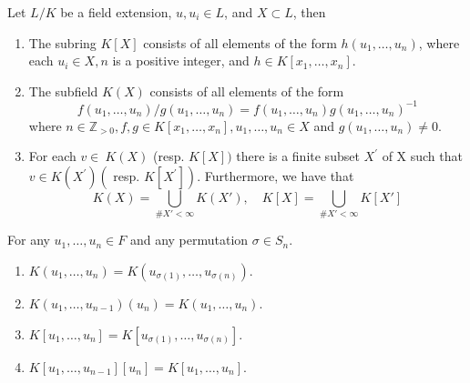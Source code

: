\begin{theorem}
    \label{thm: subfield(subring) generated by sets}
    Let $L/K$ be a field extension, $ u ,  u _{{i}} \in {L}$, and ${X} \subset {L}$, then
    \begin{enumerate}
        \item
              The subring $ K [{X}]$ consists of all elements of the form ${h}\left( u _1, \ldots,  u _{{n}}\right)$, where each $ u _{{i}} \in {X}, {n}$ is a positive integer, and $ {h} \in  K \left[ x _1, \ldots,  x _{{n}}\right]$.
        \item
              The subfield $ K ({X})$ consists of all elements of the form
              \[
                  f\left(u_1, \ldots, u_n\right) / g\left(u_1, \ldots, u_n\right)=f\left(u_1, \ldots, u_n\right) g\left(u_1, \ldots, u_n\right)^{-1}
              \]
              where ${n} \in \mathbb{Z}_{>0},  f ,  g  \in  K \left[ x _1, \ldots,  x _n\right],  u _1, \ldots,  u _n \in {X}$ and $ g \left( u _1, \ldots,  u _n\right) \neq 0$.

        \item
              For each $v \in {~K}({X})$ (resp. $ K [{X}])$ there is a finite subset ${X}^\prime$ of X such that ${v} \in  K \left({X}^\prime\right)\left(\right.$ resp. $\left. K \left[{X}^\prime\right]\right)$.
              Furthermore, we have that
              \begin{equation*}
                  K(X) = \bigcup_{\# X' < \infty} K(X') , \quad K[X] = \bigcup_{\# X' < \infty} K[X']
              \end{equation*}
    \end{enumerate}
\end{theorem}

\begin{corollary}
    For any $u_1, \ldots, u_n \in F$ and any permutation $\sigma \in S_n$.
    \begin{enumerate}
        \item
              $ K\left(u_1, \ldots, u_n\right)
                  =
                  K\left(u_{\sigma(1)}, \ldots, u_{\sigma(n)}\right)$.

        \item
              $K\left(u_1, \ldots, u_{n-1}\right)\left(u_n\right)=K\left(u_1, \ldots, u_n\right)$.

        \item
              $K\left[u_1, \ldots, u_n\right]
                  =
                  K\left[u_{\sigma(1)}, \ldots, u_{\sigma(n)}\right]$.

        \item
              $K\left[u_1, \ldots, u_{n-1}\right]\left[u_n\right]
                  =
                  K\left[u_1, \ldots, u_n\right]$.
    \end{enumerate}
\end{corollary}





